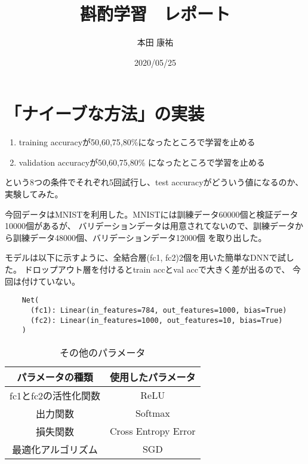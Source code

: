 \documentclass[12pt]{article}
\title{斟酌学習　レポート}
\author{本田 康祐}
\date{2020/05/25}
\begin{document}
\maketitle

\section{「ナイーブな方法」の実装}

\begin{enumerate}
    \item training accuracyが50,60,75,80\%になったところで学習を止める
    \item validation accuracyが50,60,75,80\% になったところで学習を止める
\end{enumerate}

という8つの条件でそれぞれ5回試行し、test accuracyがどういう値になるのか、実験してみた。

今回データはMNISTを利用した。MNISTには訓練データ60000個と検証データ10000個があるが、
バリデーションデータは用意されてないので、訓練データから訓練データ48000個、バリデーションデータ12000個
を取り出した。

モデルは以下に示すように、全結合層(fc1, fc2)2個を用いた簡単なDNNで試した。
ドロップアウト層を付けるとtrain accとval accで大きく差が出るので、
今回は付けていない。

\begin{verbatim}
    Net(
      (fc1): Linear(in_features=784, out_features=1000, bias=True)
      (fc2): Linear(in_features=1000, out_features=10, bias=True)
    )
\end{verbatim}

\begin{table}[H]
    \centering
    \caption{その他のパラメータ}
    \begin{tabular}{c|c}
    パラメータの種類      & 使用したパラメータ           \\ \hline
    fc1とfc2の活性化関数 & ReLU                \\ \hline
    出力関数          & Softmax             \\ \hline
    損失関数          & Cross Entropy Error \\ \hline
    最適化アルゴリズム     & SGD                 \\ 
    \end{tabular}
\end{table}

\end{document}
